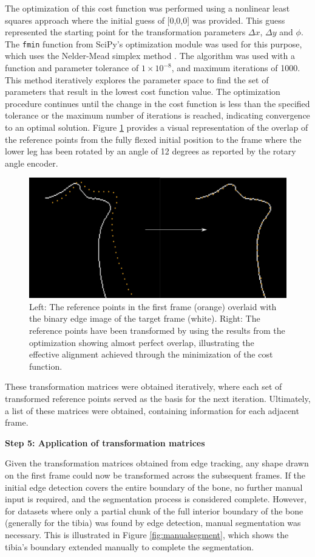 \documentclass{micro-econ-thesis}
\begin{document}
The optimization of this cost function was performed using a nonlinear least squares approach where the initial guess of [0,0,0] was provided. This guess represented the starting point for the transformation parameters $\Delta x$, $\Delta y$ and $\phi$. The \texttt{fmin} function from SciPy’s optimization module was used for this purpose, which uses the Nelder-Mead simplex method \parencite{nelder_simplex_1965}. The algorithm was used with a function and parameter tolerance of $1 \times 10^{-8}$, and maximum iterations of 1000. This method iteratively explores the parameter space to find the set of parameters that result in the lowest cost function value. The optimization procedure continues until the change in the cost function is less than the specified tolerance or the maximum number of iterations is reached, indicating convergence to an optimal solution. Figure \ref{fig:edge_tracking} provides a visual representation of the overlap of the reference points from the fully flexed initial position to the frame where the lower leg has been rotated by an angle of 12 degrees as reported by the rotary angle encoder. 
\begin{figure}[H]
	\centering
	\includegraphics[width=0.7\linewidth]{image137}
	\caption{Left: The reference points in the first frame (orange) overlaid with the binary edge image of the target frame (white). Right: The reference points have been transformed by using the results from the optimization showing almost perfect overlap, illustrating the effective alignment achieved through the minimization of the cost function.}
	\label{fig:edge_tracking}
\end{figure}

These transformation matrices were obtained iteratively, where each set of transformed reference points served as the basis for the next iteration. Ultimately, a list of these matrices were obtained, containing information for each adjacent frame. 


\textbf{Step 5: Application of transformation matrices }

Given the transformation matrices obtained from edge tracking, any shape drawn on the first frame could now be transformed across the subsequent frames. If the initial edge detection covers the entire boundary of the bone, no further manual input is required, and the segmentation process is considered complete. However, for datasets where only a partial chunk of the full interior boundary of the bone (generally for the tibia) was found by edge detection, manual segmentation was necessary. This is illustrated in Figure \ref{fig:manualsegment}, which shows the tibia's boundary extended manually to complete the segmentation. 
\end{document}
